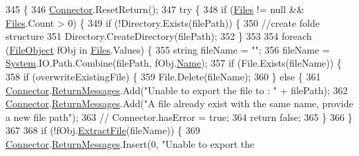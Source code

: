 \begin{DoxyCode}
345                                                                          \{
346         \mbox{\hyperlink{class_connector}{Connector}}.ResetReturn();
347         \textcolor{keywordflow}{try} \{
348             \textcolor{keywordflow}{if} (\mbox{\hyperlink{class_document_object_afe6bcf5175607f91dde768491f23a0a4}{Files}} != null && \mbox{\hyperlink{class_document_object_afe6bcf5175607f91dde768491f23a0a4}{Files}}.Count > 0) \{
349                 \textcolor{keywordflow}{if} (!Directory.Exists(filePath)) \{
350                     \textcolor{comment}{//create folde structure}
351                     Directory.CreateDirectory(filePath);
352                 \}
353 
354                 \textcolor{keywordflow}{foreach} (\mbox{\hyperlink{class_file_object}{FileObject}} fObj \textcolor{keywordflow}{in} \mbox{\hyperlink{class_document_object_afe6bcf5175607f91dde768491f23a0a4}{Files}}.Values) \{
355                     \textcolor{keywordtype}{string} fileName = \textcolor{stringliteral}{""};
356                     fileName = \mbox{\hyperlink{namespace_system}{System}}.IO.Path.Combine(filePath, fObj.\mbox{\hyperlink{class_file_object_a9d47aff166393cb47490da2661576d62}{Name}});
357                     \textcolor{keywordflow}{if} (File.Exists(fileName)) \{
358                         \textcolor{keywordflow}{if} (overwriteExistingFile) \{
359                             File.Delete(fileName);
360                         \} \textcolor{keywordflow}{else} \{
361                             \mbox{\hyperlink{class_connector}{Connector}}.\mbox{\hyperlink{class_connector_a1ed422674b344524fd77998dcf6a9ba6}{ReturnMessages}}.Add(\textcolor{stringliteral}{"Unable to export the file
       to : "} + filePath);
362                             \mbox{\hyperlink{class_connector}{Connector}}.\mbox{\hyperlink{class_connector_a1ed422674b344524fd77998dcf6a9ba6}{ReturnMessages}}.Add(\textcolor{stringliteral}{"A file already exist with
       the same name, provide a new file path"});
363                             \textcolor{comment}{// Connector.hasError = true;}
364                             \textcolor{keywordflow}{return} \textcolor{keyword}{false};
365                         \}
366                     \}
367 
368                     \textcolor{keywordflow}{if} (!fObj.\mbox{\hyperlink{class_file_object_ae21fac09c5ab2f9fac96a3f084cb9ddc}{ExtractFile}}(fileName)) \{
369                         \mbox{\hyperlink{class_connector}{Connector}}.\mbox{\hyperlink{class_connector_a1ed422674b344524fd77998dcf6a9ba6}{ReturnMessages}}.Insert(0, \textcolor{stringliteral}{"Unable to export the
}
\end{DoxyCode}
